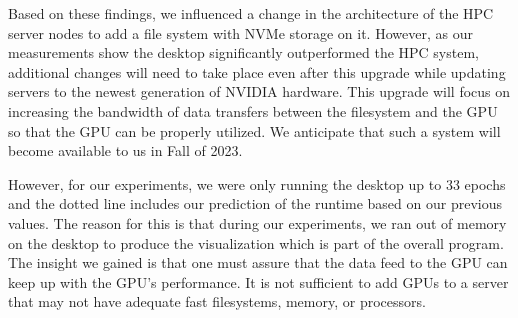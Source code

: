 \documentclass[utf8]{FrontiersinVancouver} %
\begin{document}
Based on these findings, we influenced a change in the architecture of
the HPC server nodes to add a file system with NVMe storage on
it. However, as our measurements show the desktop significantly
outperformed the HPC system, additional changes will need to take
place even after this upgrade while updating servers to the newest
generation of NVIDIA hardware. This upgrade will focus on increasing
the bandwidth of data transfers between the filesystem and the GPU so
that the GPU can be properly utilized. We anticipate that such a
system will become available to us in Fall of 2023.

However, for our experiments, we were only running the desktop up to
33 epochs and the dotted line includes our prediction of the runtime
based on our previous values. The reason for this is that during our
experiments, we ran out of memory on the desktop to produce the
visualization which is part of the overall program. The insight we
gained is that one must assure that the data feed to the GPU can keep
up with the GPU's performance. It is not sufficient to add GPUs to a
server that may not have adequate fast filesystems, memory, or
processors.
\end{document}
